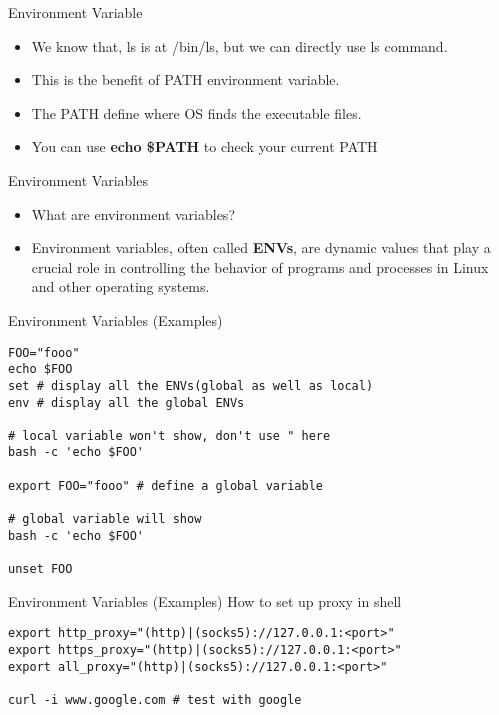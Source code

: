 \begin{frame}[fragile]{Environment Variable}
	\begin{itemize}
		\item We know that, ls is at /bin/ls, but we can directly use ls command.
		\item This is the benefit of PATH environment variable.
		\item The PATH define where OS finds the executable files.
		\item You can use \textbf{echo \$PATH} to check your current PATH
	\end{itemize}
\end{frame}

\begin{frame}[fragile]{Environment Variables}
    \begin{itemize}
        \item What are environment variables?
        \item Environment variables, often called \textbf{ENVs}, are dynamic values that play a crucial role in controlling the behavior of programs and processes in Linux and other operating systems.
    \end{itemize}
\end{frame}

\begin{frame}[fragile]{Environment Variables (Examples)}
	\begin{verbatim}
FOO="fooo"
echo $FOO
set # display all the ENVs(global as well as local)
env # display all the global ENVs

# local variable won't show, don't use " here
bash -c 'echo $FOO'

export FOO="fooo" # define a global variable

# global variable will show
bash -c 'echo $FOO'

unset FOO
	\end{verbatim}
\end{frame}

\begin{frame}[fragile]{Environment Variables (Examples)}
	How to set up proxy in shell
	\begin{verbatim}
export http_proxy="(http)|(socks5)://127.0.0.1:<port>"
export https_proxy="(http)|(socks5)://127.0.0.1:<port>"
export all_proxy="(http)|(socks5)://127.0.0.1:<port>"

curl -i www.google.com # test with google
	\end{verbatim}
\end{frame}
